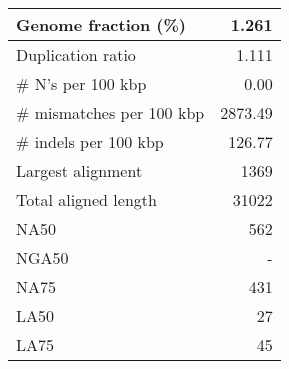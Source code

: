 \documentclass[12pt,a4paper]{article}
\begin{document}
\begin{table}[ht]
\begin{center}
\begin{tabular}{|l*{1}{|r}|}
Genome fraction (\%) & 1.261 \\ \hline
Duplication ratio & 1.111 \\ \hline
\# N's per 100 kbp & 0.00 \\ \hline
\# mismatches per 100 kbp & 2873.49 \\ \hline
\# indels per 100 kbp & 126.77 \\ \hline
Largest alignment & 1369 \\ \hline
Total aligned length & 31022 \\ \hline
NA50 & 562 \\ \hline
NGA50 & - \\ \hline
NA75 & 431 \\ \hline
LA50 & 27 \\ \hline
LA75 & 45 \\ \hline
\end{tabular}
\end{center}
\end{table}
\end{document}
